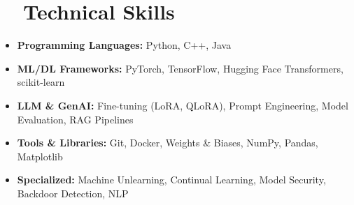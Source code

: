 \documentclass[a4paper,11pt]{article}
\newcommand{\resumeSubHeadingListStart}{\begin{itemize}[leftmargin=0.15in, label={}]}
\newcommand{\resumeSubHeadingListEnd}{\end{itemize}}
\begin{document}
\vspace{0.25cm}
\section{\faCode\ \ Technical Skills}
  \resumeSubHeadingListStart
  \vspace{0.25cm}
    \item \textbf{Programming Languages:} Python, C++, Java
    \item \textbf{ML/DL Frameworks:} PyTorch, TensorFlow, Hugging Face Transformers, scikit-learn
    \item \textbf{LLM \& GenAI:} Fine-tuning (LoRA, QLoRA), Prompt Engineering, Model Evaluation, RAG Pipelines
    \item \textbf{Tools \& Libraries:} Git, Docker, Weights \& Biases, NumPy, Pandas, Matplotlib
    \item \textbf{Specialized:} Machine Unlearning, Continual Learning, Model Security, Backdoor Detection, NLP
  \resumeSubHeadingListEnd

\vspace{0.05cm}
\end{document}
